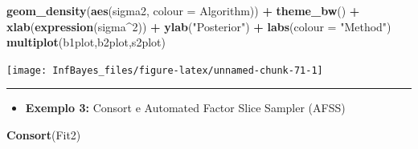 \documentclass[
]{book}
\newenvironment{Shaded}{\begin{snugshade}}{\end{snugshade}}
\newcommand{\DataTypeTok}[1]{\textcolor[rgb]{0.13,0.29,0.53}{#1}}
\newcommand{\DecValTok}[1]{\textcolor[rgb]{0.00,0.00,0.81}{#1}}
\newcommand{\KeywordTok}[1]{\textcolor[rgb]{0.13,0.29,0.53}{\textbf{#1}}}
\newcommand{\NormalTok}[1]{#1}
\newcommand{\OperatorTok}[1]{\textcolor[rgb]{0.81,0.36,0.00}{\textbf{#1}}}
\newcommand{\StringTok}[1]{\textcolor[rgb]{0.31,0.60,0.02}{#1}}
\providecommand{\tightlist}{%
  \setlength{\itemsep}{0pt}\setlength{\parskip}{0pt}}
\begin{document}
\begin{Shaded}
\begin{Highlighting}[]
\StringTok{  }\KeywordTok{geom_density}\NormalTok{(}\KeywordTok{aes}\NormalTok{(sigma2, }\DataTypeTok{colour =}\NormalTok{ Algorithm)) }\OperatorTok{+}\StringTok{ }\KeywordTok{theme_bw}\NormalTok{() }\OperatorTok{+}
\StringTok{  }\KeywordTok{xlab}\NormalTok{(}\KeywordTok{expression}\NormalTok{(sigma}\OperatorTok{^}\DecValTok{2}\NormalTok{)) }\OperatorTok{+}\StringTok{ }\KeywordTok{ylab}\NormalTok{(}\StringTok{"Posterior"}\NormalTok{) }\OperatorTok{+}\StringTok{ }\KeywordTok{labs}\NormalTok{(}\DataTypeTok{colour =} \StringTok{"Method"}\NormalTok{)}
\KeywordTok{multiplot}\NormalTok{(b1plot,b2plot,s2plot)}
\end{Highlighting}
\end{Shaded}

\begin{center}\texttt{[image: InfBayes\_files/figure-latex/unnamed-chunk-71-1]} \end{center}

\begin{center}\rule{0.5\linewidth}{0.5pt}\end{center}

\begin{itemize}
\tightlist
\item
  \textbf{Exemplo 3:} Consort e Automated Factor Slice Sampler (AFSS)
\end{itemize}

\begin{Shaded}
\begin{Highlighting}[]
\KeywordTok{Consort}\NormalTok{(Fit2)}
\end{Highlighting}
\end{Shaded}
\end{document}
